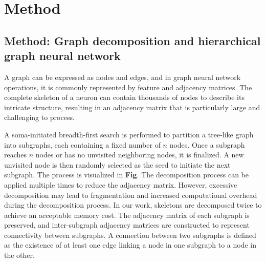 \documentclass{article}
\begin{document}
\FloatBarrier

\section{Method}


\subsection{Method: Graph decomposition and hierarchical graph neural network}
A graph can be expressed as nodes and edges, and in graph neural network operations, it is commonly represented by feature and adjacency matrices. The complete skeleton of a neuron can contain thousands of nodes to describe its intricate structure, resulting in an adjacency matrix that is particularly large and challenging to process. %

A soma-initiated breadth-first search is performed to partition a tree-like graph into subgraphs, each containing a fixed number of \(n\) nodes. Once a subgraph reaches \(n\) nodes or has no unvisited neighboring nodes, it is finalized. A new unvisited node is then randomly selected as the seed to initiate the next subgraph. The process is visualized in \textbf{Fig}. The decomposition process can be applied multiple times to reduce the adjacency matrix. However, excessive decomposition may lead to fragmentation and increased computational overhead during the decomposition process. In our work, skeletons are decomposed twice to achieve an acceptable memory cost. The adjacency matrix of each subgraph is preserved, and inter-subgraph adjacency matrices are constructed to represent connectivity between subgraphs. A connection between two subgraphs is defined as the existence of at least one edge linking a node in one subgraph to a node in the other.
\end{document}
